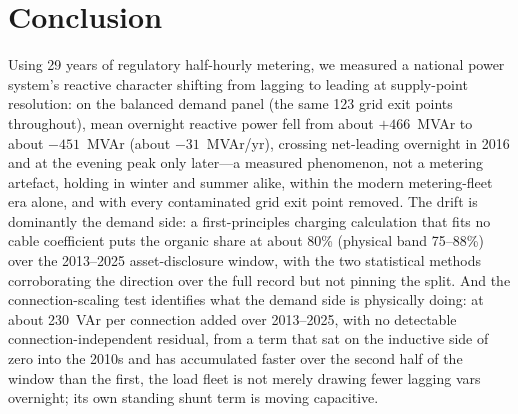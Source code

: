 \documentclass[journal]{IEEEtran}
\begin{document}
\section{Conclusion}
Using 29 years of regulatory half-hourly metering, we measured a national power
system's reactive character shifting from lagging to leading at supply-point
resolution: on the balanced demand panel (the same 123 grid exit points
throughout), mean overnight
reactive power fell from about $+466$~MVAr to about $-451$~MVAr (about
$-31$~MVAr/yr), crossing net-leading overnight in 2016 and at the
evening peak only later---a measured phenomenon, not a metering artefact,
holding in winter and summer alike, within the modern metering-fleet era alone,
and with every contaminated grid exit point removed. The drift is dominantly
the demand side: a first-principles charging calculation that fits no cable
coefficient puts the organic share at about 80\% (physical band 75--88\%) over
the 2013--2025 asset-disclosure window, with the two statistical methods
corroborating the direction over the full record but not pinning the split.
And the connection-scaling test identifies what the demand side is physically
doing: at about 230~VAr per connection added over 2013--2025, with no detectable
connection-independent residual, from a term that sat on the inductive side of
zero into the 2010s and has accumulated faster over the second half of the
window than the first, the load fleet is not merely drawing fewer lagging vars
overnight; its own standing shunt term is moving capacitive.
\end{document}

